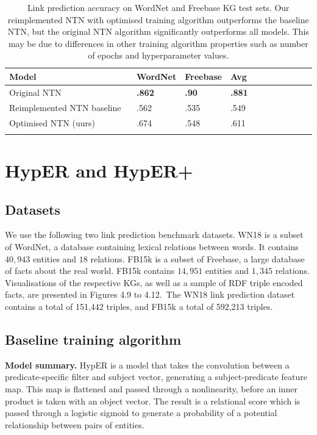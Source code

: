 \begin{table}[H]
	\centering
	\begin{tabular}{lllllllllll}
  		\textbf{Model} & \textbf{WordNet} & \textbf{Freebase} & \textbf{Avg} \\
  		\hline
  		Original NTN \unskip ~\citep{socher2013reasoning} & \textbf{.862} & \textbf{.90} & \textbf{.881} \\
  		Reimplemented NTN baseline  \unskip ~\citep{Doss2015} & .562 & .535 & .549 \\
  		\hline
  		Optimised NTN (uurs) & .674 & .548 & .611 \\
		&
	\end{tabular}
	\captionsetup{justification=centering}
	\caption{Link prediction accuracy on WordNet and Freebase KG test sets. Our reimplemented NTN with optimised training algorithm outperforms the baseline NTN, but the original NTN algorithm significantly outperforms all models. This may be due to differences in other training algorithm properties such as number of epochs and hyperparameter values.}
\end{table}



\section{HypER and HypER+}

\subsection{Datasets} 
We use the following two link prediction benchmark datasets. WN18 \citep{bordes2013translating} is a subset of WordNet, a database containing lexical relations between words. It contains $ 40, 943 $ entities and $ 18 $ relations. FB15k \citep{bordes2013translating} is a subset of Freebase, a large database of facts about the real world. FB15k contains $ 14, 951 $ entities and $ 1, 345 $ relations. Visualisations of the respective KGs, as well as a sample of RDF triple encoded facts, are presented in Figures 4.9 to 4.12.\ The WN18 link prediction dataset contains a total of 151,442 triples, and FB15k a total of 592,213 triples. 

\subsection{Baseline training algorithm}
\textbf{Model summary.} HypER is a model that takes the convolution between a predicate-specific filter and subject vector, generating a subject-predicate feature map. This map is flattened and passed through a nonlinearity, before an inner product is taken with an object vector. The result is a relational score which is passed through a logistic sigmoid to generate a probability of a potential relationship between pairs of entities. \par

